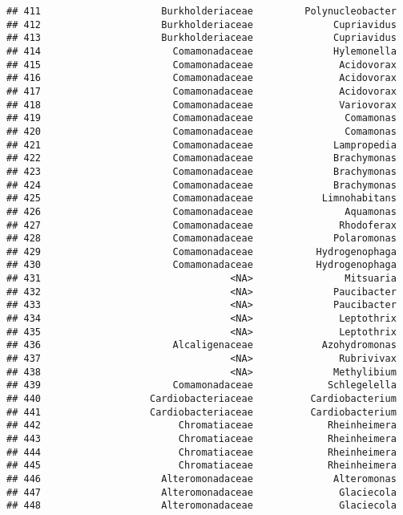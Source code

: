 \documentclass[
]{article}
\begin{document}
\begin{verbatim}
## 411                     Burkholderiaceae         Polynucleobacter
## 412                     Burkholderiaceae              Cupriavidus
## 413                     Burkholderiaceae              Cupriavidus
## 414                       Comamonadaceae              Hylemonella
## 415                       Comamonadaceae               Acidovorax
## 416                       Comamonadaceae               Acidovorax
## 417                       Comamonadaceae               Acidovorax
## 418                       Comamonadaceae               Variovorax
## 419                       Comamonadaceae                Comamonas
## 420                       Comamonadaceae                Comamonas
## 421                       Comamonadaceae              Lampropedia
## 422                       Comamonadaceae              Brachymonas
## 423                       Comamonadaceae              Brachymonas
## 424                       Comamonadaceae              Brachymonas
## 425                       Comamonadaceae            Limnohabitans
## 426                       Comamonadaceae                Aquamonas
## 427                       Comamonadaceae               Rhodoferax
## 428                       Comamonadaceae              Polaromonas
## 429                       Comamonadaceae           Hydrogenophaga
## 430                       Comamonadaceae           Hydrogenophaga
## 431                                 <NA>                Mitsuaria
## 432                                 <NA>              Paucibacter
## 433                                 <NA>              Paucibacter
## 434                                 <NA>               Leptothrix
## 435                                 <NA>               Leptothrix
## 436                       Alcaligenaceae            Azohydromonas
## 437                                 <NA>               Rubrivivax
## 438                                 <NA>              Methylibium
## 439                       Comamonadaceae             Schlegelella
## 440                   Cardiobacteriaceae          Cardiobacterium
## 441                   Cardiobacteriaceae          Cardiobacterium
## 442                        Chromatiaceae             Rheinheimera
## 443                        Chromatiaceae             Rheinheimera
## 444                        Chromatiaceae             Rheinheimera
## 445                        Chromatiaceae             Rheinheimera
## 446                     Alteromonadaceae              Alteromonas
## 447                     Alteromonadaceae               Glaciecola
## 448                     Alteromonadaceae               Glaciecola

\end{verbatim}
\end{document}
